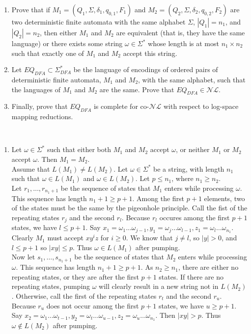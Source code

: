 \documentclass{assignment}
\begin{document}
\begin{problemlist}
\pbitem
\begin{problem}
\begin{enumerate}
\item Prove that if $M_1=(Q_1,\Sigma,\delta_1,q_{0,1},F_1)$ and $M_2=(Q_2,\Sigma,\delta_2,q_{0,2},F_2)$ are two deterministic finite automata with the same alphabet $\Sigma$, $|Q_1|=n_1$, and $|Q_2|=n_2$, then either $M_1$ and $M_2$ are equivalent (that is, they have the same language) or there exists some string $\omega \in \Sigma^*$ whose length is at most $n_1 \times n_2$ such that exactly one of $M_1$ and $M_2$ accept this string.
\item Let $EQ_{DFA} \subset \Sigma^*_{DFA}$ be the language of encodings of ordered pairs of deterministic finite automata, $M_1$ and $M_2$, with the same alphabet, such that the languages of $M_1$ and $M_2$ are the same. Prove that $EQ_{DFA}\in \mathcal{NL}$.
\item Finally, prove that $EQ_{DFA}$ is complete for co-$\mathcal{NL}$ with respect to log-space mapping reductions.
\end{enumerate}
\end{problem}
\begin{answer}
\\
\begin{enumerate}
\item Let $\omega \in \Sigma^*$ such that either both $M_1$ and $M_2$ accept $\omega$, or neither $M_1$ or $M_2$ accept $\omega$. Then $M_1 = M_2$.\\
  Assume that $L(M_1) \neq L(M_2)$.  Let $\omega \in \Sigma^*$ be a string, with length $n_1$ such that $\omega \in L(M_1)$ and $\omega \in L(M_2)$. Let $p \le n_1$, where $n_1 \ge n_2$.\\
  Let $r_1, \ldots, r_{n_1+1}$ be the sequence of states that $M_1$ enters while processing $\omega$. This sequence has length $n_1+1\ge p+1$. Among the first $p+1$ elements, two of the states must be the same by the pigeonhole principle. Call the fist of the repeating states $r_j$ and the second $r_l$. Because $r_l$ occures among the first $p+1$ states, we have $l \le p+1$. Say $x_1=\omega_1\ldots \omega_{j-1},y_1=\omega_j\ldots \omega_{l-1},z_1=\omega_l\ldots \omega_{n_1}$. Clearly $M_1$ must accept $xy^iz$ for $i\ge 0$. We know that $j\neq l$, so $|y| > 0$, and $l \le p+1$ so $|xy|\le p$. Thus $\omega \in L(M_1)$ after pumping.\\
  Now let $s_1, \ldots, s_{n_1+1}$ be the sequence of states that $M_2$ enters while processing $\omega$. This sequence has length $n_1+1 \ge p+1$. As $n_2 \ge n_1$, there are either no repeating states, or they are after the first $p+1$ states. If there are no repeating states, pumping $\omega$ will clearly result in a new string not in $L(M_2)$. Otherwise, call the first of the repeating states $r_t$ and the second $r_u$. Because $r_u$ does not occur among the first $p+1$ states, we have $u \ge p+1$. Say $x_2=\omega_1\ldots \omega_{t-1},y_2=\omega_t\ldots \omega_{u-1},z_2=\omega_u\ldots \omega_{n_1}$. Then $|xy| > p$. Thus $\omega \notin L(M_2)$ after pumping.\\

\end{enumerate}
\end{answer}
\end{problemlist}
\end{document}
